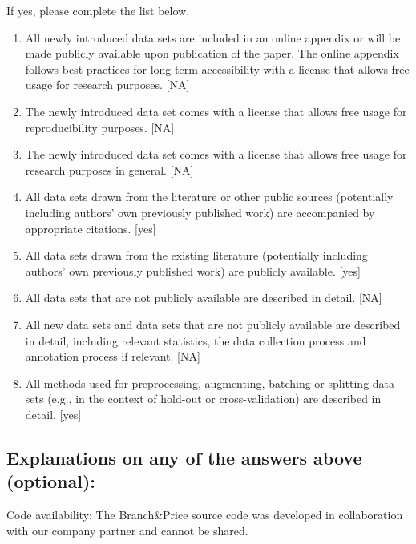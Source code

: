 \documentclass[]{amsart}
\theoremstyle{plain}
\begin{document}
If yes, please complete the list below.
\begin{enumerate}
    \item 
    All newly introduced data sets 
    are included in an online appendix 
    or will be made publicly available upon publication of the paper.
    The online appendix follows best practices for long-term accessibility with a license
    that allows free usage for research purposes.
    [NA]
    \item The newly introduced data set comes with a license that
    allows free usage for reproducibility purposes.
    [NA]
    \item The newly introduced data set comes with a license that
    allows free usage for research purposes in general.
    [NA]
    \item All data sets drawn from the literature or other public sources (potentially including authors' own previously published work) are accompanied by appropriate citations.
    [yes]
    \item All data sets drawn from the existing literature (potentially including authors’ own previously published work) are publicly available. [yes]
    \item All data sets that are not publicly available are described in detail.
    [NA]
    \item All new data sets and data sets that are not publicly available are described in detail, including relevant statistics, the data collection process and annotation process if relevant.
    [NA]
    \item 
    All methods used for preprocessing, augmenting, batching or splitting data sets (e.g., in the context of hold-out or cross-validation)
    are described in detail. [yes]
\end{enumerate}

\subsection*{Explanations on any of the answers above (optional):}

Code availability: The Branch\&Price source code was developed in collaboration with our company partner and cannot be shared.
\end{document}

